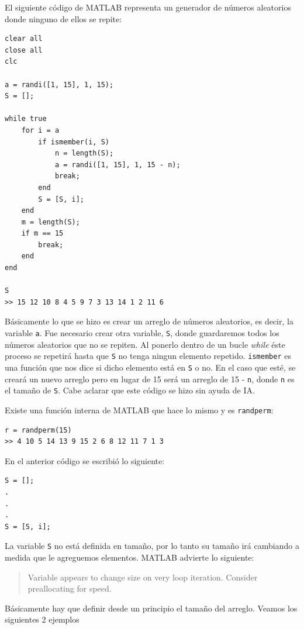 El siguiente código de MATLAB representa un generador de números aleatorios donde ninguno de ellos se repite:

\begin{lstlisting}
clear all
close all
clc

a = randi([1, 15], 1, 15);
S = [];

while true
    for i = a
        if ismember(i, S)
            n = length(S);
            a = randi([1, 15], 1, 15 - n);
            break;
        end
        S = [S, i];
    end
    m = length(S);
    if m == 15
        break;
    end
end

S 
>> 15 12 10 8 4 5 9 7 3 13 14 1 2 11 6
\end{lstlisting}


Básicamente lo que se hizo es crear un arreglo de números aleatorios, es decir, la variable \texttt{a}. Fue necesario crear otra variable, \texttt{S}, donde guardaremos todos los números aleatorios que no se repiten. Al ponerlo dentro de un bucle \textsl{while} éste proceso se repetirá hasta que \texttt{S} no tenga ningun elemento repetido. \texttt{ismember} es una función que nos dice si dicho elemento está en \texttt{S} o no. En el caso que esté, se creará un nuevo arreglo pero en lugar de 15 será un arreglo de 15 - \texttt{n}, donde \texttt{n} es el tamaño de \texttt{S}. Cabe aclarar que este código se hizo sin ayuda de IA. 

Existe una función interna de MATLAB que hace lo mismo y es \texttt{randperm}:

\begin{lstlisting}
r = randperm(15)
>> 4 10 5 14 13 9 15 2 6 8 12 11 7 1 3
\end{lstlisting}


En el anterior código se escribió lo siguiente:

\begin{lstlisting}
S = [];
.
.
.
S = [S, i];
\end{lstlisting}


La variable \texttt{S} no está definida en tamaño, por lo tanto su tamaño irá cambiando a medida que le agreguemos elementos. MATLAB advierte lo siguiente:

\begin{quote}
    Variable appears to change size on very loop iteration. Consider preallocating for speed.
\end{quote}

Básicamente hay que definir desde un principio el tamaño del arreglo. Veamos los siguientes 2 ejemplos

